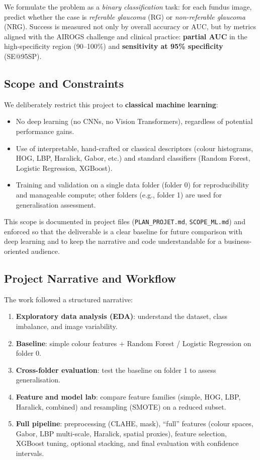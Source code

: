 \documentclass[11pt,a4paper]{article}
\begin{document}
We formulate the problem as a \emph{binary classification} task: for each fundus image, predict whether the case is \emph{referable glaucoma} (RG) or \emph{non-referable glaucoma} (NRG). Success is measured not only by overall accuracy or AUC, but by metrics aligned with the AIROGS challenge and clinical practice: \textbf{partial AUC} in the high-specificity region (90--100\%) and \textbf{sensitivity at 95\% specificity} (SE@95SP).

\subsection{Scope and Constraints}

We deliberately restrict this project to \textbf{classical machine learning}:
\begin{itemize}
  \item No deep learning (no CNNs, no Vision Transformers), regardless of potential performance gains.
  \item Use of interpretable, hand-crafted or classical descriptors (colour histograms, HOG, LBP, Haralick, Gabor, etc.) and standard classifiers (Random Forest, Logistic Regression, XGBoost).
  \item Training and validation on a single data folder (folder 0) for reproducibility and manageable compute; other folders (e.g., folder 1) are used for generalisation assessment.
\end{itemize}

This scope is documented in project files (\texttt{PLAN\_PROJET.md}, \texttt{SCOPE\_ML.md}) and enforced so that the deliverable is a clear baseline for future comparison with deep learning and to keep the narrative and code understandable for a business-oriented audience.

\subsection{Project Narrative and Workflow}

The work followed a structured narrative:
\begin{enumerate}
  \item \textbf{Exploratory data analysis (EDA)}: understand the dataset, class imbalance, and image variability.
  \item \textbf{Baseline}: simple colour features + Random Forest / Logistic Regression on folder 0.
  \item \textbf{Cross-folder evaluation}: test the baseline on folder 1 to assess generalisation.
  \item \textbf{Feature and model lab}: compare feature families (simple, HOG, LBP, Haralick, combined) and resampling (SMOTE) on a reduced subset.
  \item \textbf{Full pipeline}: preprocessing (CLAHE, mask), ``full'' features (colour spaces, Gabor, LBP multi-scale, Haralick, spatial proxies), feature selection, XGBoost tuning, optional stacking, and final evaluation with confidence intervals.
\end{enumerate}
\end{document}
